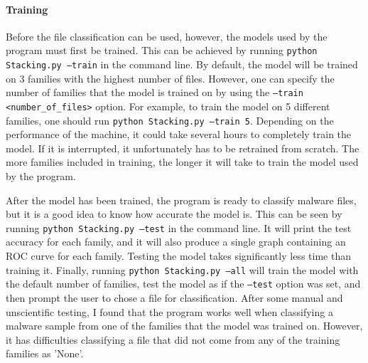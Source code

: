 \documentclass[12pt]{article}
\begin{document}
  \paragraph{Training}
Before the file classification can be used, however, the models used by the program must first be trained. This can be achieved by running  \texttt{python Stacking.py --train} in the command line. By default, the model will be trained on 3 families with the highest number of files. However, one can specify the number of families that the model is trained on by using the \texttt{--train <number\_of\_files>} option. For example, to train the model on 5 different families, one should run \texttt{python Stacking.py --train 5}. Depending on the performance of the machine, it could take several hours to completely train the model. If it is interrupted, it unfortunately has to be retrained from scratch. The more families included in training, the longer it will take to train the model used by the program. 

After the model has been trained, the program is ready to classify malware files, but it is a good idea to know how accurate the model is. This can be seen by running  \texttt{python Stacking.py --test} in the command line. It will print the test accuracy for each family, and it will also produce a single graph containing an ROC curve for each family. Testing the model takes significantly less time than training it.
Finally, running  \texttt{python Stacking.py --all} will train the model with the default number of families, test the model as if the \texttt{--test} option was set, and then prompt the user to chose a file for classification. After some manual and unscientific testing, I found that the program works well when classifying a malware sample from one of the families that the model was trained on. However, it has difficulties classifying a file that did not come from any of the training families as 'None'.
\end{document}
